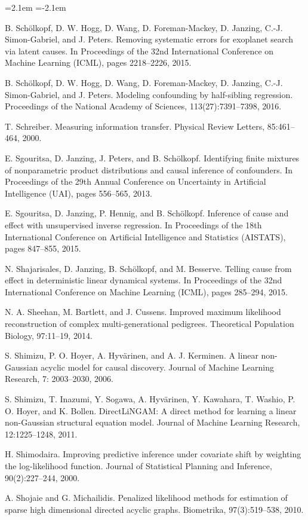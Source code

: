 \begin{list}{}{\leftmargin=2.1em
 \itemindent=-2.1em\parsep=0pt\itemsep=3pt}
\item B. Schölkopf, D. W. Hogg, D. Wang, D. Foreman-Mackey, D. Janzing, C.-J. Simon-Gabriel, and J. Peters. Removing systematic errors for exoplanet search via latent causes. In Proceedings of the 32nd International Conference on Machine Learning (ICML), pages 2218--2226, 2015.
\item B. Schölkopf, D. W. Hogg, D. Wang, D. Foreman-Mackey, D. Janzing, C.-J. Simon-Gabriel, and J. Peters. Modeling confounding by half-sibling regression. Proceedings of the National Academy of Sciences, 113(27):7391--7398, 2016.
\item T. Schreiber. Measuring information transfer. Physical Review Letters, 85:461--464, 2000.
\item E. Sgouritsa, D. Janzing, J. Peters, and B. Schölkopf. Identifying finite mixtures of nonparametric product distributions and causal inference of confounders. In Proceedings of the 29th Annual Conference on Uncertainty in Artificial Intelligence (UAI), pages 556--565, 2013.
\item E. Sgouritsa, D. Janzing, P. Hennig, and B. Schölkopf. Inference of cause and effect with unsupervised inverse regression. In Proceedings of the 18th International Conference on Artificial Intelligence and Statistics (AISTATS), pages 847--855, 2015.
\item N. Shajarisales, D. Janzing, B. Schölkopf, and M. Besserve. Telling cause from effect in deterministic linear dynamical systems. In Proceedings of the 32nd International Conference on Machine Learning (ICML), pages 285--294, 2015.
\item N. A. Sheehan, M. Bartlett, and J. Cussens. Improved maximum likelihood reconstruction of complex multi-generational pedigrees. Theoretical Population Biology, 97:11--19, 2014.
\item S. Shimizu, P. O. Hoyer, A. Hyvärinen, and A. J. Kerminen. A linear non-Gaussian acyclic model for causal discovery. Journal of Machine Learning Research, 7: 2003--2030, 2006.
\item S. Shimizu, T. Inazumi, Y. Sogawa, A. Hyvärinen, Y. Kawahara, T. Washio, P. O. Hoyer, and K. Bollen. DirectLiNGAM: A direct method for learning a linear non-Gaussian structural equation model. Journal of Machine Learning Research, 12:1225--1248, 2011.
\item H. Shimodaira. Improving predictive inference under covariate shift by weighting the log-likelihood function. Journal of Statistical Planning and Inference, 90(2):227--244, 2000.
\item A. Shojaie and G. Michailidis. Penalized likelihood methods for estimation of sparse high dimensional directed acyclic graphs. Biometrika, 97(3):519--538, 2010.

\end{list}
